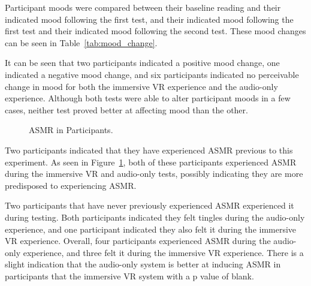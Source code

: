 \documentclass{sigchi}
\begin{document}
Participant moods were compared between their baseline reading and their indicated mood following the first test, and their indicated mood following the first test and their indicated mood following the second test. These mood changes can be seen in Table~\ref{tab:mood_change}. 

It can be seen that two participants indicated a positive mood change, one indicated a negative mood change, and six participants indicated no perceivable change in mood for both the immersive VR experience and the audio-only experience. Although both tests were able to alter participant moods in a few cases, neither test proved better at affecting mood than the other.

\begin{figure}[htb]
\centering
{}
\caption{ASMR in Participants.}
\label{fig:experienced_asmr}
\end{figure}

Two participants indicated that they have experienced ASMR previous to this experiment. As seen in Figure~\ref{fig:experienced_asmr}, both of these participants experienced ASMR during the immersive VR and audio-only tests, possibly indicating they are more predisposed to experiencing ASMR. 

Two participants that have never previously experienced ASMR experienced it during testing. Both participants indicated they felt tingles during the audio-only experience, and one participant indicated they also felt it during the immersive VR experience. Overall, four participants experienced ASMR during the audio-only experience, and three felt it during the immersive VR experience. There is a slight indication that the audio-only system is better at inducing ASMR in participants that the immersive VR system with a p value of blank.
\end{document}
